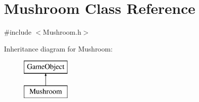 \hypertarget{class_mushroom}{}\section{Mushroom Class Reference}
\label{class_mushroom}


{\ttfamily \#include $<$Mushroom.\+h$>$}

Inheritance diagram for Mushroom\+:\begin{figure}[H]
\begin{center}
\leavevmode
\includegraphics[height=2.000000cm]{class_mushroom}
\end{center}
\end{figure}
